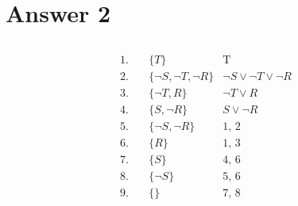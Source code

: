 \documentclass[12pt]{article}
\begin{document}
\section*{Answer 2}

\subsection*{}

\begin{align*}
    1. \hspace{1em} & \{ T \}                                                                   & \text{T} \\
    2. \hspace{1em} & \{ \neg S, \neg T, \neg R \}                                              & \text{$\neg S \vee \neg T \vee \neg R$} \\
    3. \hspace{1em} & \{ \neg T, R \}                                                           & \text{$\neg T \vee R$} \\
    4. \hspace{1em} & \{ S, \neg R \}                                                           & \text{$S \vee \neg R$} \\
    5. \hspace{1em} & \{ \neg S, \neg R \}                                                      & \text{1, 2} \\
    6. \hspace{1em} & \{ R \}                                                                   & \text{1, 3} \\
    7. \hspace{1em} & \{ S \}                                                                   & \text{4, 6} \\
    8. \hspace{1em} & \{ \neg S \}                                                              & \text{5, 6} \\ 
    9. \hspace{1em} & \{ \}                                                                     & \text{7, 8} \\
\end{align*}

\end{document}
